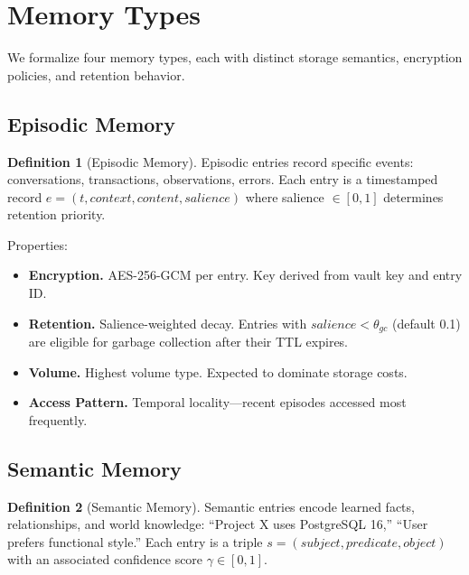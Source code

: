 \documentclass[11pt,letterpaper]{article}
\theoremstyle{definition}
\newtheorem{definition}{Definition}
\theoremstyle{remark}
\begin{document}
\section{Memory Types}
\label{sec:types}

We formalize four memory types, each with distinct storage semantics, encryption policies, and retention behavior.

\subsection{Episodic Memory}

\begin{definition}[Episodic Memory]
Episodic entries record specific events: conversations, transactions, observations, errors. Each entry is a timestamped record $e = (t, \textit{context}, \textit{content}, \textit{salience})$ where salience $\in [0, 1]$ determines retention priority.
\end{definition}

Properties:
\begin{itemize}
    \item \textbf{Encryption.} AES-256-GCM per entry. Key derived from vault key and entry ID.
    \item \textbf{Retention.} Salience-weighted decay. Entries with $\textit{salience} < \theta_{\textit{gc}}$ (default 0.1) are eligible for garbage collection after their TTL expires.
    \item \textbf{Volume.} Highest volume type. Expected to dominate storage costs.
    \item \textbf{Access Pattern.} Temporal locality---recent episodes accessed most frequently.
\end{itemize}

\subsection{Semantic Memory}

\begin{definition}[Semantic Memory]
Semantic entries encode learned facts, relationships, and world knowledge: ``Project X uses PostgreSQL 16,'' ``User prefers functional style.'' Each entry is a triple $s = (\textit{subject}, \textit{predicate}, \textit{object})$ with an associated confidence score $\gamma \in [0, 1]$.
\end{definition}
\end{document}
